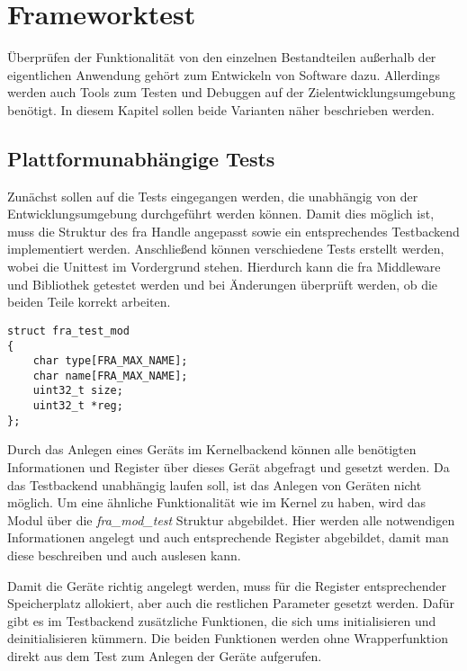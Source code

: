 \chapter{Frameworktest} \label{sec:test}
Überprüfen der Funktionalität von den einzelnen Bestandteilen außerhalb der eigentlichen Anwendung gehört zum Entwickeln von Software dazu. %
Allerdings werden auch Tools zum Testen und Debuggen auf der Zielentwicklungsumgebung benötigt. 
In diesem Kapitel sollen beide Varianten näher beschrieben werden.

\section{Plattformunabhängige Tests}
Zunächst sollen auf die Tests eingegangen werden, die unabhängig von der Entwicklungsumgebung durchgeführt werden können. 
Damit dies möglich ist, muss die Struktur des \ac{fra} Handle angepasst sowie ein entsprechendes Testbackend implementiert werden. Anschließend können verschiedene Tests erstellt werden, wobei die Unittest im Vordergrund stehen. Hierdurch kann die \ac{fra} Middleware und Bibliothek getestet werden und bei Änderungen überprüft werden, ob die beiden Teile korrekt arbeiten.

\begin{lstfloat}
\begin{lstlisting}
struct fra_test_mod
{
	char type[FRA_MAX_NAME];
	char name[FRA_MAX_NAME];
	uint32_t size;
	uint32_t *reg;
};
\end{lstlisting}
\end{lstfloat}

Durch das Anlegen eines Geräts im Kernelbackend können alle benötigten Informationen und Register über dieses Gerät abgefragt und gesetzt werden. Da das Testbackend unabhängig laufen soll, ist das Anlegen von Geräten nicht möglich. Um eine ähnliche Funktionalität wie im Kernel zu haben, wird das Modul über die \textit{fra\_mod\_test} Struktur abgebildet. Hier werden alle notwendigen Informationen angelegt und auch entsprechende Register abgebildet, damit man diese beschreiben und auch auslesen kann.


Damit die Geräte richtig angelegt werden, muss für die Register entsprechender Speicherplatz allokiert, aber auch die restlichen Parameter gesetzt werden. Dafür gibt es im Testbackend zusätzliche Funktionen, die sich ums initialisieren und deinitialisieren kümmern. Die beiden Funktionen werden ohne Wrapperfunktion direkt aus dem Test zum Anlegen der Geräte aufgerufen.\\






